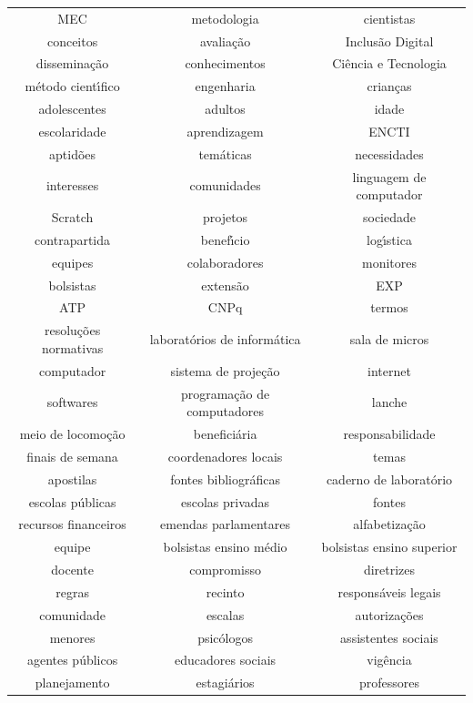 \documentclass[
12pt,		%
openright,	%
twoside,  %
a4paper,			%
chapter=TITLE,		%
english,			%
french,				%
spanish,			%
brazil				%
]{USPSC-classe/USPSC}
\begin{document}
\begin{table}[htb]
\begin{tabular}{|c|c|c|}
MEC  &  metodologia  &  cientistas  \\
conceitos  &  avalia\c{c}\~ao  &  Inclus\~ao Digital \\
dissemina\c{c}\~ao  &  conhecimentos  &  Ci\^encia e Tecnologia \\
m\'etodo cient\'{\i}fico  &  engenharia  &  crian\c{c}as \\
adolescentes  &  adultos  &  idade \\
escolaridade  &  aprendizagem  &  ENCTI \\
aptid\~oes  &  tem\'aticas  &  necessidades \\
interesses  &  comunidades  &  linguagem de computador \\
Scratch  &  projetos  &  sociedade \\
contrapartida  &  benef\'{\i}cio  &  log\'{\i}stica \\
equipes  &  colaboradores  &  monitores \\
bolsistas  &  extens\~ao  &  EXP \\
ATP  &  CNPq  &  termos \\
resolu\c{c}\~oes normativas  &  laborat\'orios de inform\'atica  &  sala de micros  \\
computador  &  sistema de proje\c{c}\~ao  &  internet \\
softwares  &  programa\c{c}\~ao de computadores  &  lanche \\
meio de locomo\c{c}\~ao  &  benefici\'aria  &  responsabilidade \\
finais de semana  &  coordenadores locais  &  temas \\
apostilas  &  fontes bibliogr\'aficas  &  caderno de laborat\'orio \\
escolas p\'ublicas  &  escolas privadas  &  fontes \\
recursos financeiros  &  emendas parlamentares  &  alfabetiza\c{c}\~ao \\
equipe  &  bolsistas ensino m\'edio  &  bolsistas ensino superior \\
docente  &  compromisso  &  diretrizes \\
regras  &  recinto  &  respons\'aveis legais \\
comunidade  &  escalas  &  autoriza\c{c}\~oes \\
menores  &  psic\'ologos  &  assistentes sociais \\
agentes p\'ublicos  &  educadores sociais  &  vig\^encia \\
planejamento  &  estagi\'arios  &  professores \\

\end{tabular}
\end{table}
\end{document}
